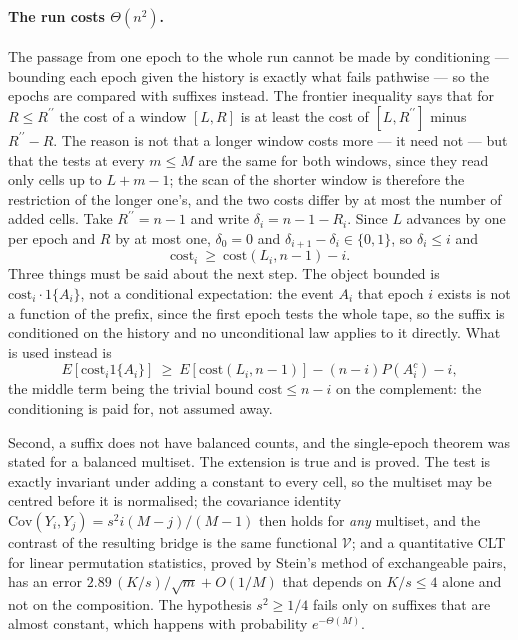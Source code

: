 \documentclass[11pt]{article}
\begin{document}
\paragraph{The run costs $\Theta(n^2)$.} The passage from one epoch to the whole run cannot be made by
conditioning --- bounding each epoch given the history is exactly what fails pathwise --- so the epochs
are compared with suffixes instead. The frontier inequality says that for $R\le R^{\prime\prime}$ the
cost of a window $[L,R]$ is at least the cost of $[L,R^{\prime\prime}]$ minus $R^{\prime\prime}-R$.
The reason is not that a longer window costs more --- it need not --- but that the tests at every
$m\le M$ are the same for both windows, since they read only cells up to $L+m-1$; the scan of the
shorter window is therefore the restriction of the longer one's, and the two costs differ by at most
the number of added cells. Take $R^{\prime\prime}=n-1$ and write $\delta_i=n-1-R_i$. Since $L$
advances by one per epoch and $R$ by at most one, $\delta_0=0$ and
$\delta_{i+1}-\delta_i\in\{0,1\}$, so $\delta_i\le i$ and
\[
\mathrm{cost}_i\ \ge\ \mathrm{cost}(L_i,n-1)-i .
\]
Three things must be said about the next step. The object bounded is $\mathrm{cost}_i\cdot 1\{A_i\}$,
not a conditional expectation: the event $A_i$ that epoch $i$ exists is not a function of the prefix,
since the first epoch tests the whole tape, so the suffix is conditioned on the history and no
unconditional law applies to it directly. What is used instead is
\[
E[\mathrm{cost}_i 1\{A_i\}]\ \ge\ E[\mathrm{cost}(L_i,n-1)]-(n-i)P(A_i^c)-i,
\]
the middle term being the trivial bound $\mathrm{cost}\le n-i$ on the complement: the conditioning is
paid for, not assumed away.

Second, a suffix does not have balanced counts, and the single-epoch theorem was stated for a balanced
multiset. The extension is true and is proved. The test is exactly invariant under adding a constant to
every cell, so the multiset may be centred before it is normalised; the covariance identity
$\mathrm{Cov}(Y_i,Y_j)=s^2i(M-j)/(M-1)$ then holds for \emph{any} multiset, and the contrast of the
resulting bridge is the same functional $\mathcal V$; and a quantitative CLT for linear permutation
statistics, proved by Stein's method of exchangeable pairs, has an error
$2.89\,(K/s)/\sqrt m+O(1/M)$ that depends on $K/s\le4$ alone and not on the composition. The
hypothesis $s^2\ge1/4$ fails only on suffixes that are almost constant, which happens with
probability $e^{-\Theta(M)}$.
\end{document}
